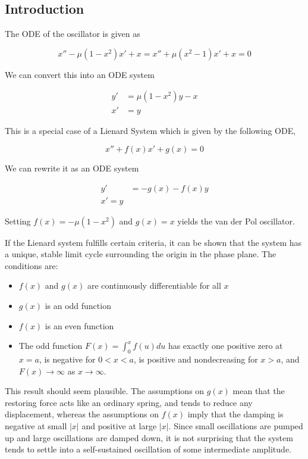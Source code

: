 
\subsection{Introduction}

The ODE of the oscillator is given as

\begin{equation}\label{20240924:eq1}
x'' - \mu(1-x^2)x' + x = x'' + \mu(x^2 - 1)x' + x = 0
\end{equation}

We can convert this into an ODE system

\begin{align*}
y' &= \mu (1-x^2) y - x \\
x' &= y
\end{align*}

This is a special case of a Lienard System which is given by the following ODE,

\begin{equation*}
x'' + f(x) x' + g(x) = 0
\end{equation*}

We can rewrite it as an ODE system

\begin{align*}
y' &= -g(x) - f(x)y \\
x' = y
\end{align*}

Setting  $f(x) = - \mu(1-x^2)$ and $g(x) = x$ yields the van der Pol oscillator. 

If the Lienard system fulfills certain criteria, it can be shown that the system has a unique, stable limit cycle surrounding the origin in the phase plane. The conditions are:

\begin{itemize}
\item $f(x)$ and $g(x)$ are continuously differentiable for all $x$
\item $g(x)$ is an odd function
\item $f(x)$ is an even function
\item The odd function $F(x) = \int_0^x f(u) du$ has exactly one positive zero at $x=a$, is negative for $0<x<a$, is positive and nondecreasing for $x>a$, and $F(x) \rightarrow \infty$ as $x \rightarrow \infty$.
\end{itemize}

This result should seem plausible. The assumptions on $g(x)$ mean that the restoring force acts like an ordinary spring, and tends to reduce any displacement, whereas the assumptions on $f(x)$ imply that the damping is negative at small $|x|$ and positive at large $|x|$. Since small oscillations are pumped up and large oscillations are damped down, it is not surprising that the system tends to settle into a self-sustained oscillation of some intermediate amplitude.

